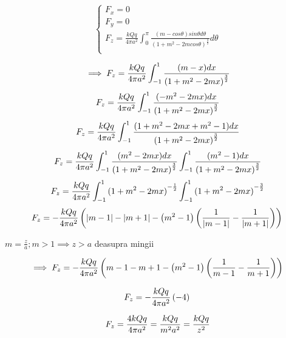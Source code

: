 \documentclass[12pt]{article}
\begin{document}
\begin{equation}
    \begin{cases}
        F_{x} = 0 \\ 
        F_{y} =  0\\ 
        F_{z} = \frac{ kQq }{ 4\pi a^{2} }\int_{0}^{\pi} \frac{ (m - cos\theta) sin\theta d \theta }{ {(1+m^{2} -2m cos\theta)}^{\frac{3}{2}} } d \theta\\

    \end{cases}
\end{equation}

\begin{equation}
    \implies F_{z} = \frac{ kQq }{ 4\pi a^{2} } \int_{-1}^{1} \frac{ (m - x) dx }{ {(1+m^{2} -2m x)}^{\frac{3}{2}} }\\
\end{equation}
\begin{equation}
    F_{z} = \frac{ kQq }{ 4\pi a^{2} } \int_{-1}^{1} \frac{ (-m^{2}-2mx) dx }{ {(1+m^{2} -2m x)}^{\frac{3}{2}} }\\
\end{equation}
\begin{equation}
    F_{z} = \frac{ kQq }{ 4\pi a^{2} } \int_{-1}^{1} \frac{ ( 1 + m^{2}-2mx+m^{2}-1 ) dx }{ {(1+m^{2} -2m x)}^{\frac{3}{2}} }\\
\end{equation}
\begin{equation}
    F_{z} = \frac{ kQq }{ 4\pi a^{2} } \int_{-1}^{1} \frac{ (m^{2}-2mx)dx }{ {(1+m^{2}-2mx)}^{\frac{3}{2}} } \int_{-1}^{1} \frac{ (m^{2} - 1)dx }{ {(1+m^{2}-2mx)}^{\frac{3}{2}}} \\
\end{equation}
\begin{equation}
    F_{z} = \frac{ kQq }{ 4\pi a^{2} } \int_{-1}^{1} {(1 + m^{2} -2mx)}^{-\frac{1}{2}} \int_{-1}^{1} {(1 + m^{2} -2mx)}^{-\frac{3}{2}} \\
\end{equation}
\begin{equation}
    F_{z} =- \frac{ kQq }{ 4\pi a^{2} } \left( \left| m - 1 \right| - \left| m + 1 \right| - \left( m^{2} - 1 \right) \left( \frac{1}{ \left| m - 1 \right| } - \frac{1}{ \left| m + 1 \right| } \right) \right)\\
\end{equation}

$ m=\frac{z}{a} ; m>1 \implies z > a$ deasupra mingii 

\begin{equation}
   \implies F_{z} =- \frac{ kQq }{ 4\pi a^{2} } \left(  m - 1  -  m + 1  - \left( m^{2} - 1 \right) \left( \frac{1}{  m - 1  } - \frac{1}{  m + 1  } \right) \right)\\
\end{equation}

\begin{equation}
    F_{z} =- \frac{ kQq }{ 4\pi a^{2} } \left(  -4\right) \\
\end{equation}

\begin{equation}
    F_{z} = \frac{ 4kQq }{ 4\pi a^{2} } = \frac{kQq}{m^{2}a^{2}}=\frac{kQq}{z^{2}} \\
\end{equation}
\end{document}
